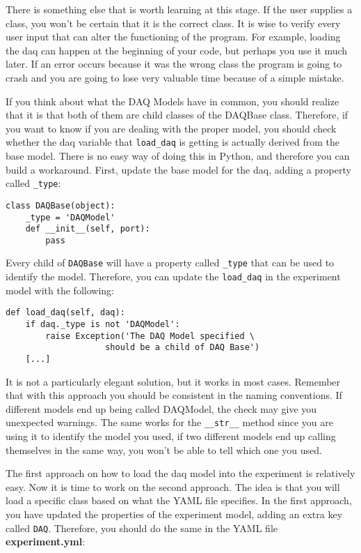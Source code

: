 There is something else that is worth learning at this stage. If the
user supplies a class, you won't be certain that it is the correct
class. It is wise to verify every user input that can alter the
functioning of the program. For example, loading the daq can happen at
the beginning of your code, but perhaps you use it much later. If an
error occurs because it was the wrong class the program is going to
crash and you are going to lose very valuable time because of a
simple mistake.

If you think about what the {DAQ} Models have in common, you should
realize that it is that both of them are child classes of the DAQBase
class. Therefore, if you want to know if you are dealing with the proper
model, you should check whether the daq variable that \texttt{load_daq}
is getting is actually derived from the base model. There is no easy way
of doing this in Python, and therefore you can build a workaround.
First, update the base model for the daq, adding a property called
\texttt{_type}:

\begin{verbatim}
class DAQBase(object):
    _type = 'DAQModel'
    def __init__(self, port):
        pass
\end{verbatim}

Every child of \texttt{DAQBase} will have a property called
\texttt{_type} that can be used to identify the model. Therefore, you
can update the \texttt{load_daq} in the experiment model with
the following:

\begin{verbatim}
def load_daq(self, daq):
    if daq._type is not 'DAQModel':
        raise Exception('The DAQ Model specified \
                    should be a child of DAQ Base')
    [...]
\end{verbatim}

It is not a particularly elegant solution, but it works in most cases.
Remember that with this approach you should be consistent in the naming
conventions. If different models end up being called DAQModel, the check
may give you unexpected warnings. The same works for the
\texttt{__str__} method since you are using it to identify the
model you used, if two different models end up calling themselves in the
same way, you won't be able to tell which one you used.

The first approach on how to load the daq model into the experiment is
relatively easy. Now it is time to work on the second approach. The idea
is that you will load a specific class based on what the {YAML} file
specifies. In the first approach, you have updated the properties of the
experiment model, adding an extra key called \texttt{DAQ}. Therefore,
you should do the same in the {YAML} file \textbf{experiment.yml}:

